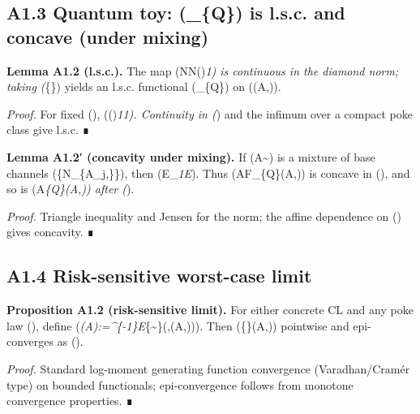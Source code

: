 \documentclass[
]{article}
\numberwithin{equation}{section}
\begin{document}
\hypertarget{a1.3-quantum-toy-_-is-l.s.c.-and-concave-under-mixing}{%
\subsection{\texorpdfstring{A1.3 Quantum toy: (\_\{\rm Q\})
is l.s.c. and concave (under
mixing)}{A1.3 Quantum toy: (\_\{\}) is l.s.c. and concave (under mixing)}}\label{a1.3-quantum-toy-_-is-l.s.c.-and-concave-under-mixing}}

\textbf{Lemma A1.2 (l.s.c.).} The map
(\mathcal N\mapsto \textbar{}\mathcal N(\Delta)\textbar{}\emph{1) is
continuous in the diamond norm; taking
(\inf}\{\Phi\in{}\}) yields an l.s.c. functional
(\_\{\rm Q\}) on ((A,\Phi)).

\emph{Proof.} For fixed (\Delta),
(\textbar{}\cdot(\Delta)\textbar{}\emph{1\le \textbar{}\cdot\textbar{}}\diamond\textbar{}\Delta\textbar{}\emph{1).
Continuity in (\textbar{}\cdot\textbar{}}\diamond) and the infimum over
a compact poke class give l.s.c. ∎

\textbf{Lemma A1.2′ (concavity under mixing).} If (A\sim \mu) is a
mixture of base channels (\{\mathcal N\_\{A\_j,\Phi\}\}), then
(\textbar{}\mathbb E\_\textbar{}\emph{1\le \mathbb E}).
Thus (A\mapsto F\_\{\rm Q\}(A,\Phi)) is concave in (\mu), and so is
(A\mapsto {}\emph{\{\rm Q\}(A,\Phi)) after (\inf}\Phi).

\emph{Proof.} Triangle inequality and Jensen for the norm; the affine
dependence on (\mu) gives concavity. ∎

\hypertarget{a1.4-risk-sensitive-worst-case-limit}{%
\subsection{A1.4 Risk-sensitive worst-case
limit}\label{a1.4-risk-sensitive-worst-case-limit}}

\textbf{Proposition A1.2 (risk-sensitive limit).} For either concrete CL
and any poke law (\Pi), define
(\emph{\beta(A):=\beta\^{}\{-1\}\log\mathbb E}\{\Phi\sim\Pi\}\exp(\beta,(A,\Phi))).
Then
(\emph{\beta\searrow \inf}\{\Phi\in{}\}(A,\Phi))
pointwise and epi-converges as (\beta\to\infty).

\emph{Proof.} Standard log-moment generating function convergence
(Varadhan/Cramér type) on bounded functionals; epi-convergence follows
from monotone convergence properties. ∎
\end{document}
